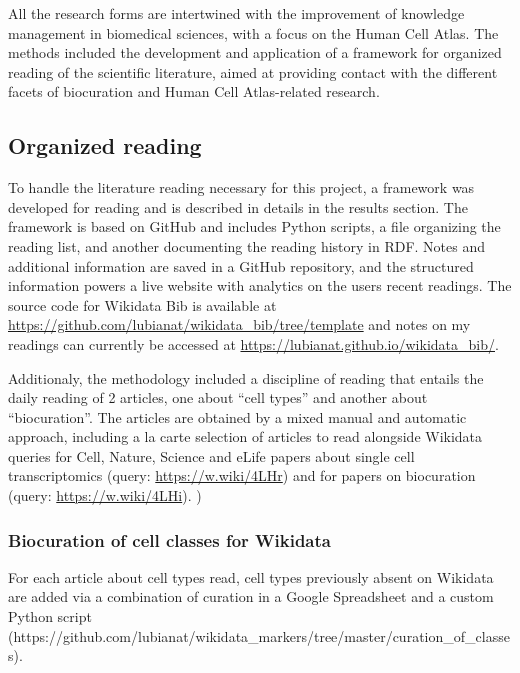 All the research forms are intertwined with the improvement of knowledge management in biomedical sciences, with a focus on the Human Cell Atlas. The methods included the development and application of a framework for organized reading of the scientific literature, aimed at providing contact with the different facets of biocuration and Human Cell Atlas-related research.

\hypertarget{organized-reading}{%
\subsection{Organized reading}\label{organized-reading}}

To handle the literature reading necessary for this project, a framework was developed for reading and is described in details in the results section.
The framework is based on GitHub and includes Python scripts, a file organizing the reading list, and another documenting the reading history in RDF. Notes and additional information are saved in a GitHub repository, and the structured information powers a live website with analytics on the users recent readings. The source code for Wikidata Bib is available at \url{https://github.com/lubianat/wikidata_bib/tree/template} and notes on my readings can currently be accessed at \url{https://lubianat.github.io/wikidata_bib/}.

Additionaly, the methodology included a discipline of reading that entails the daily reading of 2 articles, one about ``cell types'' and another about ``biocuration''.
The articles are obtained by a mixed manual and automatic approach, including a la carte selection of articles to read alongside Wikidata queries for Cell, Nature, Science and eLife papers about single cell transcriptomics (query: \url{https://w.wiki/4LHr}) and for papers on biocuration (query: \url{https://w.wiki/4LHi}).
)

\hypertarget{biocuration-of-cell-classes-for-wikidata}{%
\subsubsection{Biocuration of cell classes for Wikidata}\label{biocuration-of-cell-classes-for-wikidata}}

For each article about cell types read, cell types previously absent on Wikidata are added via a combination of curation in a Google Spreadsheet and a custom Python script (https://github.com/lubianat/wikidata\_markers/tree/master/curation\_of\_classes).

